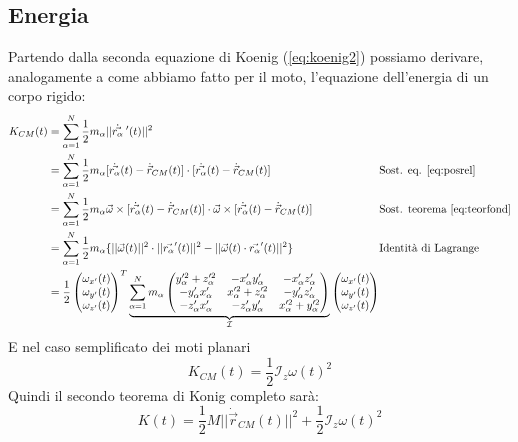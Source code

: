 \subsection{Energia}
Partendo dalla seconda equazione di Koenig (\ref{eq:koenig2}) possiamo derivare, analogamente a come abbiamo fatto per il moto, l'equazione dell'energia di un corpo rigido:
\begin{equation}
	\begin{alignedat}{2}
		K_{CM}(t) & = \sum_{\alpha=1}^N \frac{1}{2}m_\alpha \lvert\lvert \dot{\vec{r_\alpha}}\:'(t)\rvert\rvert^2\\
		& = \sum_{\alpha=1}^N \frac{1}{2}m_\alpha [\dot{\vec{r_\alpha}}(t)-\dot{\vec{r}}_{CM}(t)] \cdot [\dot{\vec{r_\alpha}}(t)-\dot{\vec{r}}_{CM}(t)] \qquad\qquad\qquad&& \text{Sost. eq. \ref{eq:posrel}} \\
		& = \sum_{\alpha=1}^N \frac{1}{2}m_\alpha \vec{\omega} \times [\dot{\vec{r_\alpha}}(t)-\dot{\vec{r}}_{CM}(t)] \cdot \vec{\omega} \times [\dot{\vec{r_\alpha}}(t)-\dot{\vec{r}}_{CM}(t)]  && \text{Sost. teorema \ref{eq:teorfond}} \\
		& = \sum_{\alpha=1}^N \frac{1}{2} m_\alpha \{\lvert\lvert \vec{\omega}(t) \rvert\rvert^2 \cdot \lvert\lvert \vec{r_\alpha}'(t) \rvert\rvert^2 - \lvert\lvert \vec{\omega}(t) \cdot \vec{r_\alpha}'(t)\rvert\rvert^2\} && \text{Identità di Lagrange} \\
		& = \frac{1}{2} \begin{pmatrix}
			\omega_{x'}(t) \\ \omega_{y'}(t) \\ \omega_{z'}(t)
		\end{pmatrix}^T \underbrace{\sum_{\alpha=1}^N m_\alpha \begin{pmatrix}
			y_\alpha^{\prime2} + z_\alpha^{\prime2} & -x_\alpha'y_\alpha' & -x_\alpha'z_\alpha' \\
			-y_\alpha'x_\alpha' & x_\alpha'^2+z_\alpha'^2 & -y_\alpha'z_\alpha' \\
			-z_\alpha'x_\alpha' & -z_\alpha'y_\alpha' & x_\alpha'^2+y_\alpha'^2
			\end{pmatrix}}_\mathcal{I}  \begin{pmatrix}
			\omega_{x'}(t) \\ \omega_{y'}(t) \\ \omega_{z'}(t)
		\end{pmatrix}
	\end{alignedat}
\end{equation}
E nel caso semplificato dei moti planari
\begin{equation}
	K_{CM}(t) = \frac{1}{2}\mathcal{I}_z\omega(t)^2
\end{equation}
Quindi il secondo teorema di Konig completo sarà:
\begin{equation}
	\label{eq:koenig2cr}
	K(t) = \frac{1}{2} M \lvert\lvert \dot{\vec{r}}_{CM}(t)\rvert\rvert^2 + \frac{1}{2}\mathcal{I}_z\omega(t)^2
\end{equation}

